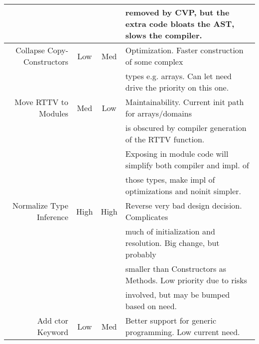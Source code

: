 \begin{tabular}{|r|c|c|l|}
 & & & removed by CVP, but the extra code bloats the AST, slows the compiler. \\ \hline
Collapse Copy-Constructors & Low & Med & Optimization. Faster construction of some complex \\
 & & & types e.g. arrays. Can let need drive the priority on this one. \\ \hline
Move RTTV to Modules & Med & Low & Maintainability. Current init path for arrays/domains \\
 & & & is obscured by compiler generation of the RTTV function. \\
 & & & Exposing in module code will simplify both compiler and impl. of \\
 & & & those types, make impl of optimizations and noinit simpler. \\ \hline
Normalize Type Inference & High & High & Reverse very bad design decision. Complicates \\
 & & & much of initialization and resolution. Big change, but probably \\
 & & & smaller than Constructors as Methods. Low priority due to risks \\
 & & & involved, but may be bumped based on need. \\ \hline
Add ctor Keyword & Low & Med & Better support for generic programming.  Low current need. \\ \hline
\end{tabular}
